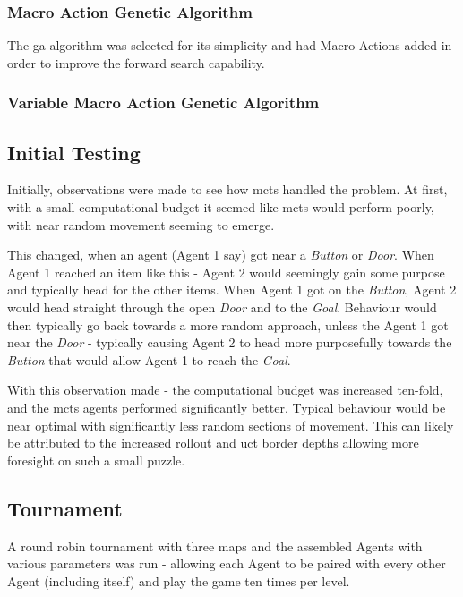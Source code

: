 \documentclass{IEEEtran}
\begin{document}
\subsubsection{Macro Action Genetic Algorithm}
The \gls{ga} algorithm was selected for its simplicity and had Macro Actions added in order to improve the forward search capability.
\subsubsection{Variable Macro Action Genetic Algorithm}

\subsection{Initial Testing}
Initially, observations were made to see how \gls{mcts} handled the problem. At first, with a small computational budget it seemed like \gls{mcts} would perform poorly, with near random movement seeming to emerge.

This changed, when an agent (Agent 1 say) got near a \emph{Button} or \emph{Door}. When Agent 1 reached an item like this - Agent 2 would seemingly gain some purpose and typically head for the other items. When Agent 1 got on the \emph{Button}, Agent 2 would head straight through the open \emph{Door} and to the \emph{Goal}. Behaviour would then typically go back towards a more random approach, unless the Agent 1 got near the \emph{Door} - typically causing Agent 2 to head more purposefully towards the \emph{Button} that would allow Agent 1 to reach the \emph{Goal}.

With this observation made - the computational budget was increased ten-fold, and the \gls{mcts} agents performed significantly better. Typical behaviour would be near optimal with significantly less random sections of movement. This can likely be attributed to the increased rollout and uct border depths allowing more foresight on such a small puzzle.
\subsection{Tournament}
A round robin tournament with three maps and the assembled Agents with various parameters was run - allowing each Agent to be paired with every other Agent (including itself) and play the game ten times per level.


\end{document}
